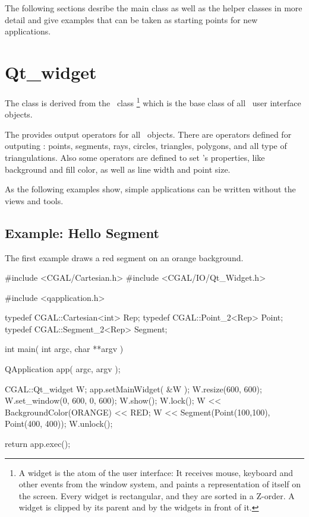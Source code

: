 The following sections desribe the main class as well as the helper classes
in more detail and give examples that can be taken as starting points for
new applications.


\section{Qt\_widget}
\label{Qt_widget}

The class  is derived from the \qt\ class %
\footnote{A widget is the atom of the user interface: It receives mouse, keyboard and other 
events from the window system, and paints a representation of itself on the 
screen. Every widget is rectangular, and they are sorted in a Z-order. A 
widget is clipped by its parent and by the widgets in front of it.} 
which is the base class of all \qt\ user interface objects. 


The  provides output operators for all \cgal\ objects. There are 
operators defined for outputing : points, segments, rays, circles, triangles, 
polygons, and all type of triangulations. Also some operators are defined to 
set 's properties, like background and fill color, as well as line
width and point size.

As the following examples show, simple applications can be written
without the views and tools.

\subsection{Example: Hello Segment}

The first example draws a red segment on an orange background.

\begin{ccExampleCode}
#include <CGAL/Cartesian.h>
#include <CGAL/IO/Qt_Widget.h>

#include <qapplication.h>

typedef CGAL::Cartesian<int> Rep;
typedef CGAL::Point_2<Rep>   Point;
typedef CGAL::Segment_2<Rep> Segment;

int main( int argc, char **argv )
{
    QApplication app( argc, argv );

    CGAL::Qt_widget W;
    app.setMainWidget( &W );
    W.resize(600, 600);
    W.set_window(0, 600, 0, 600);
    W.show();
    W.lock();
    W << BackgroundColor(ORANGE) << RED;
    W << Segment(Point(100,100), Point(400, 400));
    W.unlock();

    return app.exec();
}
\end{ccExampleCode}

